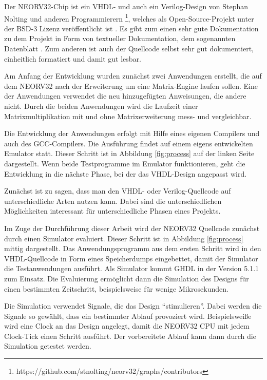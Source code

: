 Der NEORV32-Chip ist ein VHDL- und auch ein Verilog-Design von Stephan Nolting und anderen Programmierern \footnote{https://github.com/stnolting/neorv32/graphs/contributors}, welches als Open-Source-Projekt unter der BSD-3 Lizenz veröffentlicht ist \cite{NEORV32_github}. Es gibt zum einen sehr gute Dokumentation zu dem Projekt in Form von textueller Dokumentation, dem sogenannten Datenblatt \cite{NEORV32_DataSheet}. Zum anderen ist auch der Quellcode selbst sehr gut dokumentiert, einheitlich formatiert und damit gut lesbar.

Am Anfang der Entwicklung wurden zunächst zwei Anwendungen erstellt, die auf dem NEORV32 nach der Erweiterung um eine Matrix-Engine laufen sollen. Eine der Anwendungen verwendet die neu hinzugefügten Anweisungen, die andere nicht. Durch die beiden Anwendungen wird die Laufzeit einer Matrixmultiplikation mit und ohne Matrixerweiterung mess- und vergleichbar.

Die Entwicklung der Anwendungen erfolgt mit Hilfe eines eigenen Compilers und auch des GCC-Compilers. Die Ausführung findet auf einem eigens entwickelten Emulator statt. Dieser Schritt ist in Abbildung \ref{fig:process} auf der linken Seite dargestellt. Wenn beide Testprogramme im Emulator funktionieren, geht die Entwicklung in die nächste Phase, bei der das VHDL-Design angepasst wird.

Zunächst ist zu sagen, dass man den VHDL- oder Verilog-Quellcode auf unterschiedliche Arten nutzen kann. Dabei sind die unterschiedlichen Möglichkeiten interessant für unterschiedliche Phasen eines Projekts.

Im Zuge der Durchführung dieser Arbeit wird der NEORV32 Quellcode zunächst durch einen Simulator evaluiert. Dieser Schritt ist in Abbildung \ref{fig:process} mittig dargestellt. Das Anwendungsprogramm aus dem ersten Schritt wird in den VHDL-Quellcode in Form eines Speicherdumps eingebettet, damit der Simulator die Testanwendungen ausführt. Als Simulator kommt GHDL in der Version 5.1.1 zum Einsatz. Die Evaluierung ermöglicht dann die Simulation des Designs für einen bestimmten Zeitschritt, beispielsweise für wenige Mikrosekunden.

Die Simulation verwendet Signale, die das Design ``stimulieren''. Dabei werden die Signale so gewählt, dass ein bestimmter Ablauf provoziert wird. Beispielsweiße wird eine Clock an das Design angelegt, damit die NEORV32 CPU mit jedem Clock-Tick einen Schritt ausführt. Der vorbereitete Ablauf kann dann durch die Simulation getestet werden.

